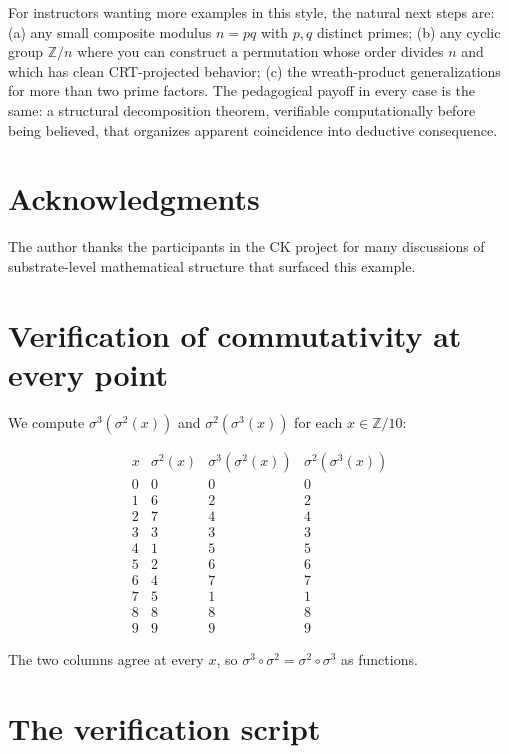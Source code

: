 \documentclass[11pt]{article}
\theoremstyle{plain}
\theoremstyle{definition}
\theoremstyle{remark}
\begin{document}
For instructors wanting more examples in this style, the natural next steps are: (a) any small composite modulus $n = pq$ with $p, q$ distinct primes; (b) any cyclic group $\mathbb{Z}/n$ where you can construct a permutation whose order divides $n$ and which has clean CRT-projected behavior; (c) the wreath-product generalizations for more than two prime factors. The pedagogical payoff in every case is the same: a structural decomposition theorem, verifiable computationally before being believed, that organizes apparent coincidence into deductive consequence.

\section*{Acknowledgments}

The author thanks the participants in the CK project for many discussions of substrate-level mathematical structure that surfaced this example.

\appendix

\section{Verification of commutativity at every point}
\label{app:verification}

We compute $\sigma^3(\sigma^2(x))$ and $\sigma^2(\sigma^3(x))$ for each $x \in \mathbb{Z}/10$:

\[
\begin{array}{c|c|c|c}
x & \sigma^2(x) & \sigma^3(\sigma^2(x)) & \sigma^2(\sigma^3(x)) \\
\hline
0 & 0 & 0 & 0 \\
1 & 6 & 2 & 2 \\
2 & 7 & 4 & 4 \\
3 & 3 & 3 & 3 \\
4 & 1 & 5 & 5 \\
5 & 2 & 6 & 6 \\
6 & 4 & 7 & 7 \\
7 & 5 & 1 & 1 \\
8 & 8 & 8 & 8 \\
9 & 9 & 9 & 9
\end{array}
\]

The two columns agree at every $x$, so $\sigma^3 \circ \sigma^2 = \sigma^2 \circ \sigma^3$ as functions.

\section{The verification script}
\label{app:script}
\end{document}
